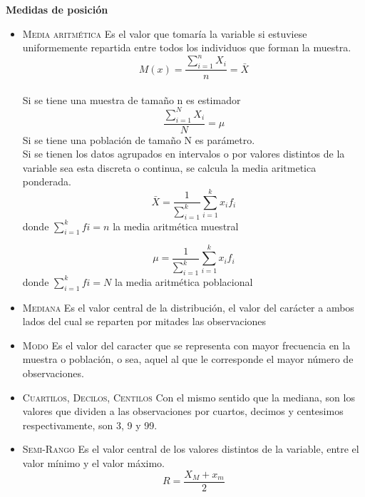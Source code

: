 \documentclass[10pt,a4paper]{article}
\begin{document}
	\textbf{Medidas de posición}
	\begin{itemize}
		\item \textsc{Media aritmética} Es el valor que tomaría la variable si estuviese uniformemente repartida entre todos los individuos que forman la muestra.
		\begin{equation}
			M(x)=\frac{\sum_{i=1}^{n}X_i}{n}=\bar{X}
		\end{equation}\\
		Si se tiene una muestra de tamaño n es estimador
		\begin{equation}
			\frac{\sum_{i=1}^{N}X_i}{N}=\mu
		\end{equation}
		Si se tiene una población de tamaño N es parámetro.\\
		Si se tienen los datos agrupados en intervalos o por valores distintos de la variable sea esta discreta o continua, se calcula la media aritmetica ponderada.
		\begin{equation}
			\bar{X}=\frac{1}{\sum_{i=1}^{k}}\sum_{i=1}^{k}x_i f_i
		\end{equation}
		donde $\sum_{i=1}^{k}fi=n$ la media aritmética muestral
		
		\begin{equation}
			\mu=\frac{1}{\sum_{i=1}^{k}}\sum_{i=1}^{k}x_i f_i
		\end{equation}
		donde $\sum_{i=1}^{k}fi=N$ la media aritmética poblacional
		\item \textsc{Mediana} Es el valor central de la distribución, el valor del carácter a ambos lados del cual se reparten por mitades las observaciones\\
		\item \textsc{Modo} Es el valor del caracter que se representa con mayor frecuencia en la muestra o población, o sea, aquel al que le corresponde el mayor número de observaciones.\\
		\item \textsc{Cuartilos, Decilos, Centilos} Con el mismo sentido que la mediana, son los valores que dividen a las observaciones por cuartos, decimos y centesimos respectivamente, son 3, 9 y 99.\\
		\item \textsc{Semi-Rango} Es el valor central de los valores distintos de la variable, entre el valor mínimo y el valor máximo.
		\begin{equation}
		R=\frac{X_M+x_m}{2}
		\end{equation}
	\end{itemize}
\end{document}
